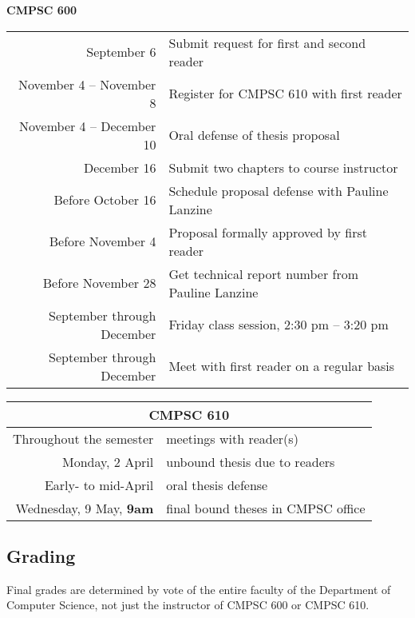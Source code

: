 {\bf CMPSC 600}
\begin{center}
\begin{tabular}{r|l}
\hline
September 6 & Submit request for first and second reader \\ 
November 4 -- November 8 & Register for CMPSC 610 with first reader \\
November 4 -- December 10 & Oral defense of thesis proposal \\
December 16 & Submit two chapters to course instructor \\
\hline
Before October 16 & Schedule proposal defense with Pauline Lanzine \\
Before November 4 & Proposal formally approved by first reader \\
Before November 28 & Get technical report number from Pauline Lanzine\\
\hline
September through December & Friday class session, 2:30 pm -- 3:20 pm \\
September through December & Meet with first reader on a regular basis \\
\hline
\end{tabular}
\end{center}

\begin{center}
	\begin{tabular}{rl}
\hline
\multicolumn{2}{c}{\bf CMPSC 610}\\\hline
Throughout the semester & meetings with reader(s)\\ 
Monday, 2 April & unbound thesis due to readers\\
Early- to mid-April & oral thesis defense\\
Wednesday, 9 May, \bf 9am & final bound theses in CMPSC office
\end{tabular}
\end{center}

\subsection*{Grading}

Final grades are determined by vote of
the entire faculty of the Department of Computer Science, not just the
instructor of CMPSC 600 or CMPSC 610.

